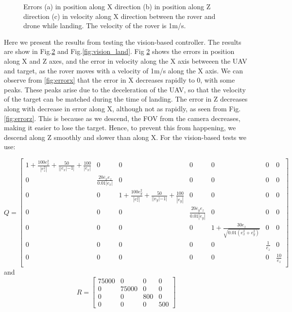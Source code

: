 \documentclass[conf]{new-aiaa}
\begin{document}
\begin{figure}[h]
\begin{subfigure}{0.33\textwidth}
    \caption{} \label{fig:error_vel}
  \end{subfigure}%
  \hspace*{\fill} 
 \caption{Errors (a) in position along X direction (b) in position along Z direction (c) in velocity along X direction between the rover and drone while landing. The velocity of the rover is 1m/s.} \label{fig:errors}
\end{figure}

Here we present the results from testing the vision-based controller. The results are show in Fig.\ref{fig:errors} and Fig.\ref{fig:vision_land}. Fig \ref{fig:errors} shows the errors in position along X and Z axes, and the error in velocity along the X axis betweeen the UAV and target, as the rover moves with a velocity of 1m/s along the X axis. We can observe from \ref{fig:errorx} that the error in X decreases rapidly to 0, with some peaks. These peaks arise due to the deceleration of the UAV, so that the velocity of the target can be matched during the time of landing. The error in Z decreases along with decrease in error along X, although not as rapidly, as seen from Fig.\ref{fig:errorz}. This is because as we descend, the FOV from the camera decreases, making it easier to lose the target. Hence, to prevent this from happening, we descend along Z smoothly and slower than along X. For the vision-based tests we use:


\begin{equation}
Q = \begin{bmatrix}
1+\frac{100e_{x}^{2}}{|e_{z}^{2}|} + \frac{50}{||e_{x}|-1|} + \frac{100}{|e_{x}|} & 0 & 0 & 0 & 0 & 0 & 0\\
0 & \frac{20\dot{e_{x}}e_{z}}{0.01|e_{x}|} & 0 & 0 & 0 & 0 & 0\\
0 & 0 & 1+\frac{100e_{y}^{2}}{|e_{z}^{2}|} + \frac{50}{||e_{y}|-1|} + \frac{100}{|e_{y}|} & 0 & 0 & 0 & 0\\
0 & 0 & 0 & \frac{20\dot{e_{y}}e_{z}}{0.01|e_{y}|} & 0 & 0 & 0\\
0 & 0 & 0 & 0 & 1 + \frac{30e_{z}}{\sqrt{0.01(e_{x}^{2}+e_{y}^{2})}} & 0 & 0\\
0 & 0 & 0 & 0 & 0 & \frac{1}{e_{z}} & 0\\
0 & 0 & 0 & 0 & 0 & 0 & \frac{10}{e_{z}}\\
\end{bmatrix}
\end{equation}
and 
\begin{equation}
R = \begin{bmatrix}
75000 & 0 & 0 & 0\\
0 & 75000 & 0 & 0\\
0 & 0 & 800 & 0\\
0 & 0 & 0 & 500
\end{bmatrix}
\end{equation}
\end{document}
